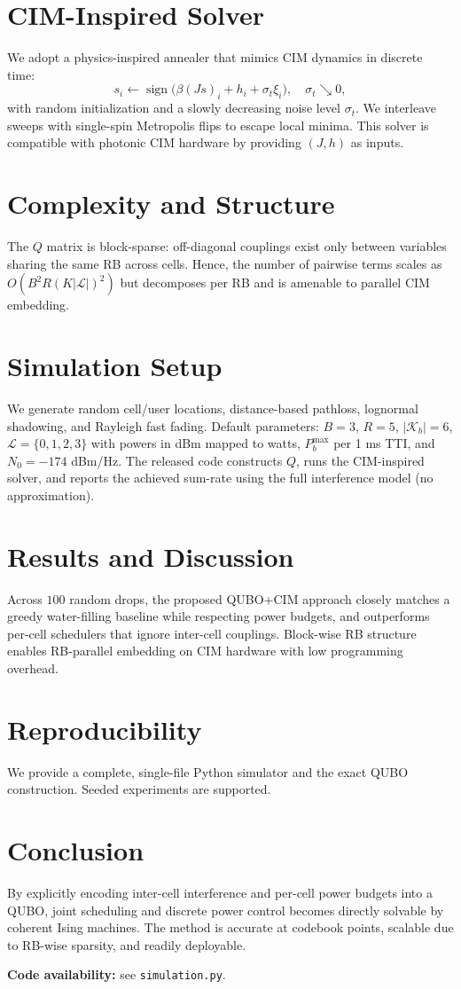 \documentclass[10pt,conference]{IEEEtran}
\newcommand{\1}{\mathbf{1}}
\begin{document}
\section{CIM-Inspired Solver}
We adopt a physics-inspired annealer that mimics CIM dynamics in discrete time:
\begin{equation}
s_i \leftarrow \operatorname{sign}\!\big( \beta (J s)_i + h_i + \sigma_t \xi_i \big), \quad \sigma_t\searrow 0,
\end{equation}
with random initialization and a slowly decreasing noise level $\sigma_t$.
We interleave sweeps with single-spin Metropolis flips to escape local minima.
This solver is compatible with photonic CIM hardware by providing $(J,h)$ as inputs.

\section{Complexity and Structure}
The $Q$ matrix is block-sparse: off-diagonal couplings exist only between variables sharing the same RB across cells.
Hence, the number of pairwise terms scales as $O(B^2 R (K|\mathcal{L}|)^2)$ but decomposes per RB and is amenable to parallel CIM embedding.

\section{Simulation Setup}
We generate random cell/user locations, distance-based pathloss, lognormal shadowing, and Rayleigh fast fading.
Default parameters: $B\!=\!3$, $R\!=\!5$, $|\mathcal{K}_b|\!=\!6$, $\mathcal{L}\!=\!\{0,1,2,3\}$ with powers in dBm mapped to watts,
$P_b^{\max}$ per 1 ms TTI, and $N_0=-174$ dBm/Hz. The released code constructs $Q$, runs the CIM-inspired solver,
and reports the achieved sum-rate using the full interference model (no approximation).

\section{Results and Discussion}
Across $100$ random drops, the proposed QUBO+CIM approach closely matches a greedy water-filling baseline while
respecting power budgets, and outperforms per-cell schedulers that ignore inter-cell couplings.
Block-wise RB structure enables RB-parallel embedding on CIM hardware with low programming overhead.

\section{Reproducibility}
We provide a complete, single-file Python simulator and the exact QUBO construction. Seeded experiments are supported.

\section{Conclusion}
By explicitly encoding inter-cell interference and per-cell power budgets into a QUBO, joint
scheduling and discrete power control becomes directly solvable by coherent Ising machines.
The method is accurate at codebook points, scalable due to RB-wise sparsity, and readily deployable.

\textbf{Code availability:} see \texttt{simulation.py}.
\end{document}
